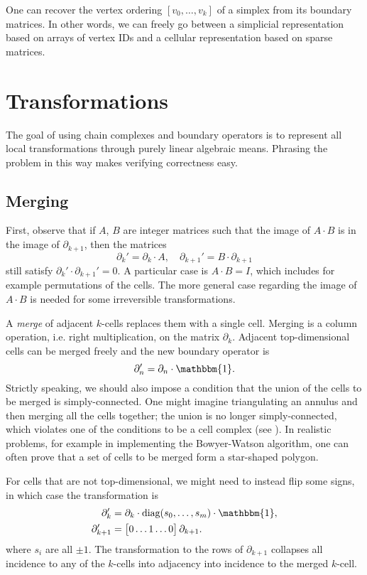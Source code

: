 \documentclass[twocolumn]{article}
\begin{document}
One can recover the vertex ordering $[v_0, \ldots, v_k]$ of a simplex from its boundary matrices.
In other words, we can freely go between a simplicial representation based on arrays of vertex IDs and a cellular representation based on sparse matrices.


\section{Transformations}

The goal of using chain complexes and boundary operators is to represent all local transformations through purely linear algebraic means.
Phrasing the problem in this way makes verifying correctness easy.

\subsection{Merging}

First, observe that if $A$, $B$ are integer matrices such that the image of $A\cdot B$ is in the image of $\partial_{k + 1}$, then the matrices
\begin{equation}
    \partial_k' = \partial_k\cdot A, \quad \partial_{k + 1}' = B\cdot\partial_{k + 1}
\end{equation}
still satisfy $\partial_k'\cdot\partial_{k + 1}' = 0$.
A particular case is $A\cdot B = I$, which includes for example permutations of the cells.
The more general case regarding the image of $A\cdot B$ is needed for some irreversible transformations.

A \emph{merge} of adjacent $k$-cells replaces them with a single cell.
Merging is a column operation, i.e. right multiplication, on the matrix $\partial_k$.
Adjacent top-dimensional cells can be merged freely and the new boundary operator is
\begin{equation}
    \partial_n' = \partial_n\cdot\mathbbm{1}.
\end{equation}
Strictly speaking, we should also impose a condition that the union of the cells to be merged is simply-connected.
One might imagine triangulating an annulus and then merging all the cells together; the union is no longer simply-connected, which violates one of the conditions to be a cell complex (see \cite{hatcher2002algebraic}).
In realistic problems, for example in implementing the Bowyer-Watson algorithm, one can often prove that a set of cells to be merged form a star-shaped polygon.

For cells that are not top-dimensional, we might need to instead flip some signs, in which case the transformation is
\begin{align}
    \partial_k' & = \partial_k\cdot\text{diag}(s_0, \ldots, s_m)\cdot\mathbbm{1}, \\
    \partial_{k + 1}' & = \left[\begin{matrix} 0 \ldots 1 \ldots 0\end{matrix}\right]\partial_{k + 1}.
\end{align}
where $s_i$ are all $\pm 1$.
The transformation to the rows of $\partial_{k + 1}$ collapses all incidence to any of the $k$-cells into adjacency into incidence to the merged $k$-cell.
\end{document}
